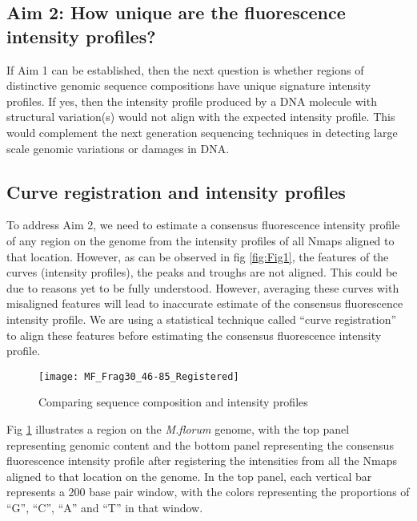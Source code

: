 \documentclass[11pt]{extarticle} %
\begin{document}
\subsection*{Aim 2: How unique are the fluorescence intensity profiles?}
If Aim 1 can be established, then the next question is whether regions of distinctive genomic sequence compositions have unique signature intensity profiles. If yes, then the intensity profile produced by a DNA molecule with structural variation(s) would not align with the expected intensity profile. This would complement the next generation sequencing techniques in detecting large scale genomic variations or damages in DNA. 

\subsection*{Curve registration and intensity profiles}
To address Aim 2, we need to estimate a consensus fluorescence intensity profile of any region on the genome from the intensity profiles  of all Nmaps aligned to that location. However, as can be observed in fig \ref{fig:Fig1}, the features of the curves (intensity profiles), the peaks and troughs are not aligned. This could be due to reasons yet to be fully understood. However, averaging these curves with misaligned features will lead to inaccurate estimate of the consensus fluorescence intensity profile. We are using a statistical technique called ``curve registration'' to align these features before estimating the consensus fluorescence intensity profile. 

\begin{figure}[H]
	\centering
	\texttt{[image: MF\_Frag30\_46-85\_Registered]}
	\caption{Comparing sequence composition and intensity profiles}
	\label{fig:Fig2}
\end{figure}
Fig \ref{fig:Fig2} illustrates a region on the {\emph{M.florum}} genome, with the top panel representing genomic content and the bottom panel representing the consensus fluorescence intensity profile after registering the intensities from all the Nmaps aligned to that location on the genome. In the top panel, each vertical bar represents a 200 base pair window, with the colors representing the proportions of ``G'', ``C'', ``A'' and ``T'' in that window. 
\end{document}
